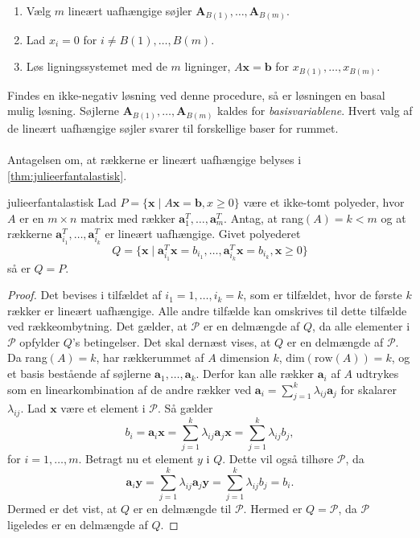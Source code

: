 %
\begin{enumerate}
\item Vælg $m$ lineært uafhængige søjler $\textbf{A}_{B(1)},\ldots,\textbf{A}_{B(m)}.$
\item Lad $x_i=0$ for $i \neq B(1),\ldots,B(m).$
\item Løs ligningssystemet med de $m$ ligninger, $A\textbf{x}=\textbf{b}$ for $x_{B(1)}, \ldots , x_{B(m)}.$
\end{enumerate}
%
Findes en ikke-negativ løsning ved denne procedure, så er løsningen en basal mulig løsning.
Søjlerne $\textbf{A}_{B(1)},\ldots,\textbf{A}_{B(m)}$ kaldes for \textit{basisvariablene}.
Hvert valg af de lineært uafhængige søjler svarer til forskellige baser for rummet.
\\\\
%
Antagelsen om, at rækkerne er lineært uafhængige belyses i \ref{thm:julieerfantalastisk}.
%
\begin{thm}{}{julieerfantalastisk}
Lad $P=\{\textbf{x} \mid  A\textbf{x}=\textbf{b},x \geq 0\}$ være et ikke-tomt polyeder, hvor $A$ er en $m \times n$ matrix med rækker $\textbf{a}^{T}_{1},\ldots,\textbf{a}^{T}_{m}$.
Antag, at rang$(A)=k<m$ og at rækkerne $\textbf{a}^T_{i_1},\ldots,\textbf{a}^T_{i_k}$ er lineært uafhængige. Givet polyederet 
$$Q=\{\textbf{x} \mid \textbf{a}^T_{i_1}\textbf{x}=b_{i_1},\ldots,\textbf{a}^T_{i_k}\textbf{x}=b_{i_k}, \textbf{x} \geq 0  \}$$ 
så er $Q=P$.
\end{thm}
\begin{proof}
Det bevises i tilfældet af $i_1=1,\ldots,i_k=k$, som er tilfældet, hvor de første $k$ rækker er lineært uafhængige. 
Alle andre tilfælde kan omskrives til dette tilfælde ved rækkeombytning. 
Det gælder, at $\mathcal{P}$ er en delmængde af $Q$, da alle elementer i $\mathcal{P}$ opfylder $Q$'s betingelser.
Det skal dernæst vises, at $Q$ er en delmængde af $\mathcal{P}$.
Da rang$(A)=k$, har rækkerummet af $A$ dimension $k$, $\text{dim}(\text{row}(A)) = k$, og et basis bestående af søjlerne $\textbf{a}_1,\ldots,\textbf{a}_k$. 
Derfor kan alle rækker $\textbf{a}_i$ af $A$ udtrykes som en linearkombination af de andre rækker ved $\textbf{a}_i=\sum^{k}_{j=1}\lambda_{ij}\textbf{a}_j$ for skalarer $\lambda_{ij}$. 
Lad $\textbf{x}$ være et element i $\mathcal{P}$. 
Så gælder
$$b_i=\textbf{a}_i\textbf{x}=\sum^{k}_{j=1}\lambda_{ij}\textbf{a}_j\textbf{x}=\sum^{k}_{j=1}\lambda_{ij}b_j,$$
for $i=1,\ldots,m.$
Betragt nu et element $y$ i $Q$. 
Dette vil også tilhøre $\mathcal{P}$, da
$$ \textbf{a}_i\textbf{y}=\sum^{k}_{j=1}\lambda_{ij}\textbf{a}_j\textbf{y}=\sum^{k}_{j=1}\lambda_{ij}b_j=b_i.$$
Dermed er det vist, at $Q$ er en delmængde til $\mathcal{P}$.
Hermed er $Q=\mathcal{P}$, da $\mathcal{P}$ ligeledes er en delmængde af $Q$.
\end{proof} \\